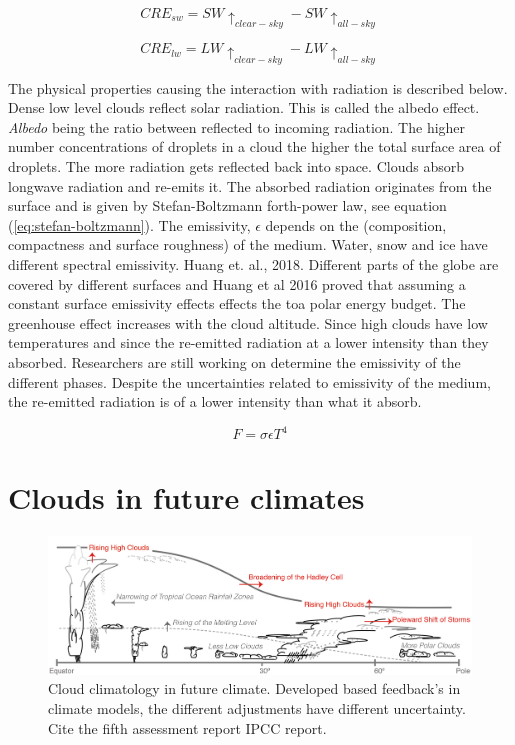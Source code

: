 \begin{equation} \label{eq:cre_sw}
    CRE_{sw} = SW\uparrow_{clear-sky} - SW\uparrow_{all-sky}
\end{equation}

\begin{equation} \label{eq:cre_lw}
    CRE_{lw} = LW\uparrow_{clear-sky} - LW\uparrow_{all-sky}
\end{equation}

The physical properties causing the interaction with radiation is described below. Dense low level clouds reflect solar radiation. This is called the albedo effect. \textit{Albedo} being the ratio between reflected to incoming radiation. The higher number concentrations of droplets in a cloud the higher the total surface area of droplets. The more radiation gets reflected back into space. Clouds absorb longwave radiation and re-emits it. The absorbed radiation originates from the surface and is given by Stefan-Boltzmann forth-power law, see equation (\ref{eq:stefan-boltzmann}). The emissivity, $\epsilon$ depends on the (composition, compactness and surface roughness) of the medium. Water, snow and ice have different spectral emissivity. Huang et. al., 2018. Different parts of the globe are covered by different surfaces and Huang et al 2016 proved that assuming a constant surface emissivity effects effects the \acrshort{toa} polar energy budget. The greenhouse effect increases with the cloud altitude. Since high clouds have low temperatures and since the re-emitted radiation at a lower intensity than they absorbed. Researchers are still working on determine the emissivity of the different phases. Despite the uncertainties related to emissivity of the medium, the re-emitted radiation is of a lower intensity than what it absorb.

\begin{equation} \label{eq:stefan-boltzmann}
    F = \sigma \epsilon T ^4
\end{equation}

\section{Clouds in future climates} \label{sec:intro_cloud_future_climates}
\begin{figure}[h]
    \centering
    \includegraphics[scale = 0.8]{Chapter1_Intro/images/Fig7-11_ipcc.jpg}
    \caption{Cloud climatology in future climate. Developed based feedback's in climate models, the different adjustments have different uncertainty. Cite the fifth assessment report IPCC report.}
    \label{fig:cloud_scheme}
\end{figure}

